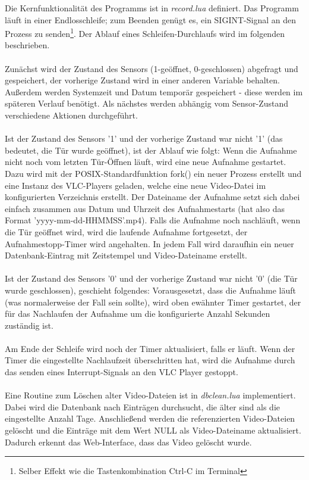 Die Kernfunktionalit\"at des Programms ist in \textit{record.lua} definiert.
Das Programm l\"auft in einer Endlosschleife; zum Beenden gen\"ugt es,  ein SIGINT-Signal an den Prozess zu senden\footnote{Selber Effekt wie  die  Tastenkombination Ctrl-C im Terminal}. Der Ablauf eines Schleifen-Durchlaufs wird im folgenden beschrieben.\\
\\
Zun\"achst wird der Zustand des Sensors (1-ge\"offnet, 0-geschlossen) abgefragt und gespeichert, der vorherige Zustand wird in einer anderen Variable behalten. Au{\ss}erdem werden Systemzeit und Datum tempor\"ar gespeichert - diese werden im sp\"ateren Verlauf ben\"otigt.
Als n\"achstes werden abh\"angig vom Sensor-Zustand verschiedene Aktionen durchgef\"uhrt.\\
\\
Ist der Zustand des Sensors '1' und der vorherige Zustand war nicht '1' (das bedeutet, die T\"ur wurde ge\"offnet), ist der Ablauf wie folgt:
Wenn die Aufnahme nicht noch vom letzten T\"ur-\"Offnen l\"auft, wird eine neue Aufnahme gestartet. Dazu wird mit der POSIX-Standardfunktion fork() ein neuer Prozess erstellt und eine Instanz des VLC-Players geladen, welche eine neue Video-Datei im konfigurierten Verzeichnis erstellt. Der Dateiname der Aufnahme setzt sich dabei einfach zusammen aus Datum und Uhrzeit des Aufnahmestarts (hat also das Format 'yyyy-mm-dd-HHMMSS'.mp4).
Falls die Aufnahme noch nachl\"auft, wenn die T\"ur ge\"offnet wird, wird die laufende Aufnahme fortgesetzt, der Aufnahmestopp-Timer wird angehalten.
In jedem Fall wird daraufhin ein neuer Datenbank-Eintrag mit Zeitstempel und Video-Dateiname erstellt.\\
\\
Ist der Zustand des Sensors '0' und der vorherige Zustand war nicht '0' (die T\"ur wurde geschlossen), geschieht folgendes:
Vorausgesetzt, dass die Aufnahme l\"auft (was normalerweise der Fall sein sollte), wird oben ew\"ahnter Timer gestartet, der f\"ur das Nachlaufen der Aufnahme um die konfigurierte Anzahl Sekunden zust\"andig ist.\\
\\
Am Ende der Schleife wird noch der Timer aktualisiert, falls er l\"auft.
Wenn der Timer die eingestellte Nachlaufzeit \"uberschritten hat, wird die Aufnahme durch das senden eines Interrupt-Signals an den VLC Player gestoppt.\\
\\

Eine Routine zum L\"oschen alter Video-Dateien ist in \textit{dbclean.lua} implementiert. Dabei wird die Datenbank nach Eintr\"agen durchsucht, die \"alter sind als die eingestellte Anzahl Tage. Anschlie{\ss}end werden die referenzierten Video-Dateien gel\"oscht und die Eintr\"age mit dem Wert NULL als Video-Dateiname aktualisiert. Dadurch erkennt das Web-Interface, dass das Video gel\"oscht wurde.
\vspace{1.5cm}